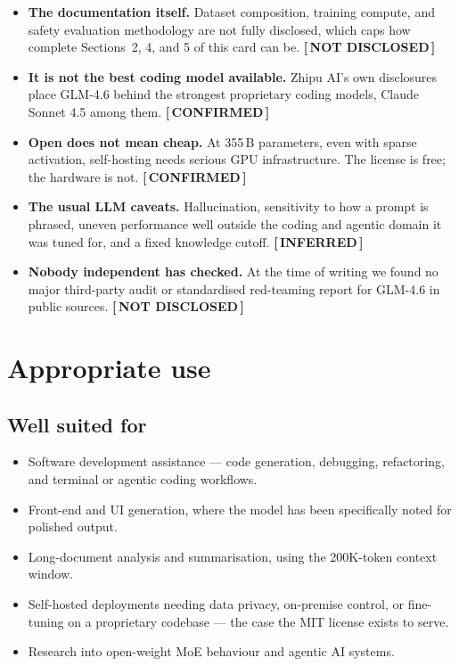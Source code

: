\documentclass[11pt,a4paper]{article}
\newcommand{\tg}[2]{{\scriptsize\sffamily\bfseries\color{#1}[\,#2\,]}}
\newcommand{\Conf}{\tg{moss}{CONFIRMED}}
\newcommand{\Infr}{\tg{clay}{INFERRED}}
\newcommand{\Undi}{\tg{stone}{NOT DISCLOSED}}
\begin{document}
\begin{itemize}
  \item \textbf{The documentation itself.} Dataset composition, training compute, and safety
        evaluation methodology are not fully disclosed, which caps how complete Sections~2, 4,
        and 5 of this card can be. \Undi
  \item \textbf{It is not the best coding model available.} Zhipu AI's own disclosures place
        GLM-4.6 behind the strongest proprietary coding models, Claude Sonnet 4.5 among
        them. \Conf
  \item \textbf{Open does not mean cheap.} At 355\,B parameters, even with sparse activation,
        self-hosting needs serious GPU infrastructure. The license is free; the hardware is
        not. \Conf
  \item \textbf{The usual LLM caveats.} Hallucination, sensitivity to how a prompt is phrased,
        uneven performance well outside the coding and agentic domain it was tuned for, and a
        fixed knowledge cutoff. \Infr
  \item \textbf{Nobody independent has checked.} At the time of writing we found no major
        third-party audit or standardised red-teaming report for GLM-4.6 in public sources. \Undi
\end{itemize}

\section{Appropriate use}

\subsection*{Well suited for}
\begin{itemize}
  \item Software development assistance --- code generation, debugging, refactoring, and terminal
        or agentic coding workflows.
  \item Front-end and UI generation, where the model has been specifically noted for polished
        output.
  \item Long-document analysis and summarisation, using the 200K-token context window.
  \item Self-hosted deployments needing data privacy, on-premise control, or fine-tuning on a
        proprietary codebase --- the case the MIT license exists to serve.
  \item Research into open-weight MoE behaviour and agentic AI systems.
\end{itemize}
\end{document}
